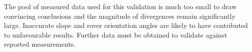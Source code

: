 The pool of measured data used for this validation is much too small to draw convincing conclusions and the magnitude of divergences remain significantly large. Inaccurate slope and rover orientation angles are likely to have contributed to unfavourable results. Further data must be obtained to validate  against reported measurements. %



